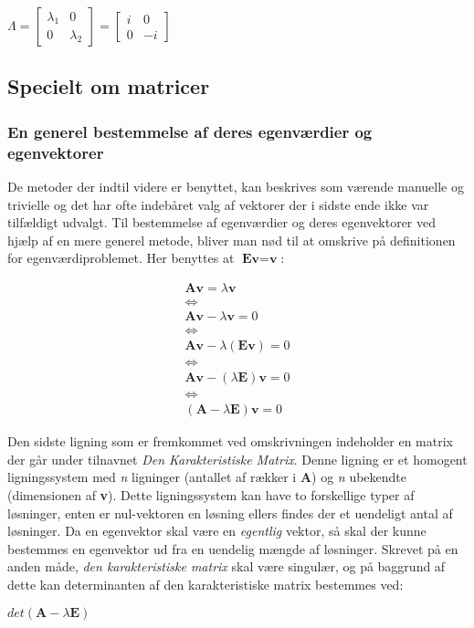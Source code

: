 \documentclass{article}
\newcommand{\cent}[1]{\begin{center}#1\end{center}}
\newcommand{\mat}[1]{\begin{gather*}#1\end{gather*}}
\newcommand{\smallMatrix}[4]{\ensuremath{\begin{bmatrix}
			#1 & #2 \\
			#3 & #4
\end{bmatrix}}}
\begin{document}
	\cent{$ \Lambda = \smallMatrix{\lambda_1}{0}{0}{\lambda_2} = \smallMatrix{i}{0}{0}{-i} $}
	
	
	
	\subsection{Specielt om matricer}
	\subsubsection{En generel bestemmelse af deres egenværdier og egenvektorer}
	
	De metoder der indtil videre er benyttet, kan beskrives som værende manuelle og trivielle og det har ofte indebåret valg af vektorer der i sidste ende ikke var tilfældigt udvalgt. Til bestemmelse af egenværdier og deres egenvektorer ved hjælp af en mere generel metode, bliver man nød til at omskrive på definitionen for egenværdiproblemet. Her benyttes at $ \textbf{Ev}=\textbf{v} $:
	
	\mat{\textbf{Av} = \lambda \textbf{v} 
		 \\ \Leftrightarrow  \\
		  \textbf{Av} - \lambda \textbf{v} = 0 
		  \\ \Leftrightarrow \\
	  		\textbf{Av} - \lambda (\textbf{Ev}) = 0 \\
	  		\Leftrightarrow \\
  				\textbf{Av} - (\lambda \textbf{E})\textbf{v} = 0 \\ 
  				\Leftrightarrow \\
  					(\textbf{A}-\lambda \textbf{E})\textbf{v}=0}
  	
  	Den sidste ligning som er fremkommet ved omskrivningen indeholder en matrix der går under tilnavnet \textit{Den Karakteristiske Matrix}. Denne ligning er et homogent ligningssystem med \textit{n} ligninger (antallet af rækker i \textbf{A}) og \textit{n} ubekendte (dimensionen af \textbf{v}). Dette ligningssystem kan have to forskellige typer af løsninger, enten er nul-vektoren en løsning ellers findes der et uendeligt antal af løsninger. Da en egenvektor skal være en \textit{egentlig} vektor, så skal der kunne bestemmes en egenvektor ud fra en uendelig mængde af løsninger. Skrevet på en anden måde, \textit{den karakteristiske matrix} skal være singulær, og på baggrund af dette kan determinanten af den karakteristiske matrix bestemmes ved:
  	
  	\cent{$ det(\textbf{A}-\lambda \textbf{E}) $}
  	
\end{document}
